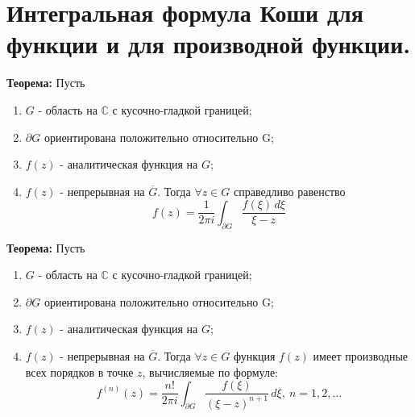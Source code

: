\section{Интегральная формула Коши для функции и для производной
функции.}\label{ux438ux43dux442ux435ux433ux440ux430ux43bux44cux43dux430ux44f-ux444ux43eux440ux43cux443ux43bux430-ux43aux43eux448ux438-ux434ux43bux44f-ux444ux443ux43dux43aux446ux438ux438-ux438-ux434ux43bux44f-ux43fux440ux43eux438ux437ux432ux43eux434ux43dux43eux439-ux444ux443ux43dux43aux446ux438ux438.}

\textbf{Теорема:} Пусть

\begin{enumerate}
\def\labelenumi{\arabic{enumi}.}
\tightlist
\item
  \(G\) - область на \(\mathbb{C}\) с кусочно-гладкой границей;
\item
  \(\partial G\) ориентирована положительно относительно G;
\item
  \(f(z)\) - аналитическая функция на \(G\);
\item
  \(f(z)\) - непрерывная на \(\overline{G}\). Тогда \(\forall z\in G\)
  справедливо равенство \[
  f(z)= \frac{1}{2\pi i}\int_{\partial G} \frac{f(\xi)\,d\xi}{\xi-z}
  \]
\end{enumerate}

\textbf{Теорема:} Пусть

\begin{enumerate}
\def\labelenumi{\arabic{enumi}.}
\tightlist
\item
  \(G\) - область на \(\mathbb{C}\) с кусочно-гладкой границей;
\item
  \(\partial G\) ориентирована положительно относительно G;
\item
  \(f(z)\) - аналитическая функция на \(G\);
\item
  \(f(z)\) - непрерывная на \(\overline{G}\). Тогда \(\forall z\in G\)
  функция \(f(z)\) имеет производные всех порядков в точке \(z\),
  вычисляемые по формуле: \[
  f^{(n)}(z)= \frac{n!}{2\pi i}\int_{\partial G} \frac{f(\xi)}{(\xi-z)^{n+1}}\,d\xi, \ n=1,2,\dots
  \]
\end{enumerate}
